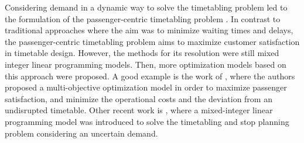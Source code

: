 \documentclass[Afour,sagev,times]{sagej}
\begin{document}
Considering demand in a dynamic way to solve the timetabling problem led to the formulation of the passenger-centric timetabling problem \cite{Robenek2016}. In contrast to traditional approaches where the aim was to minimize waiting times and delays, the passenger-centric timetabling problem aims to maximize customer satisfaction in timetable design. However, the methods for its resolution were still mixed integer linear programming models. Then, more optimization models based on this approach were proposed. A good example is the work of \cite{Binder2017}, where the authors proposed a multi-objective optimization model in order to maximize passenger satisfaction, and minimize the operational costs and the deviation from an undisrupted timetable. Other recent work is \cite{Cacchiani2020}, where a mixed-integer linear programming model was introduced to solve the timetabling and stop planning problem considering an uncertain demand.

\end{document}
